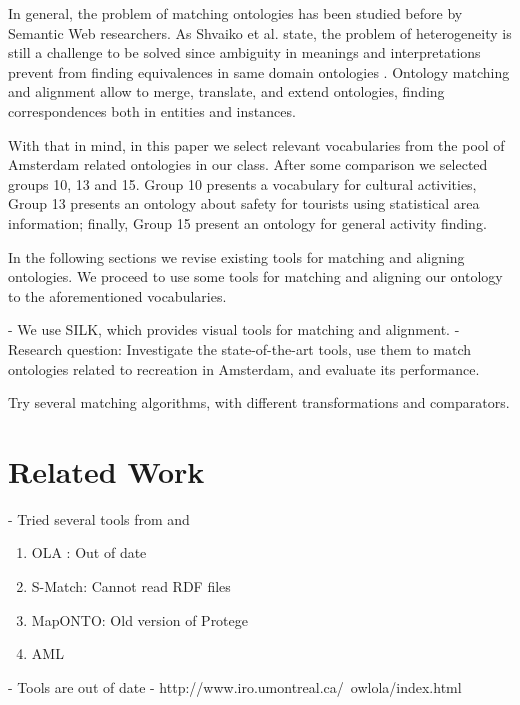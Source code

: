 \documentclass[runningheads,a4paper]{../../StyleFiles/llncs}
\begin{document}
In general, the problem of matching ontologies has been studied before by Semantic Web researchers. As Shvaiko et al. state, the problem of heterogeneity is still a challenge to be solved since ambiguity in meanings and interpretations prevent from finding equivalences in same domain ontologies \cite{shvaiko2013ontology}. Ontology matching and alignment allow to merge, translate, and extend ontologies, finding correspondences both in entities and instances.

With that in mind, in this paper we select relevant vocabularies from the pool of Amsterdam related ontologies in our class. After some comparison we selected groups 10, 13 and 15. Group 10 presents a vocabulary for cultural activities, Group 13 presents an ontology about safety for tourists using statistical area information; finally, Group 15 present an ontology for general activity finding.

In the following sections we revise existing tools for matching and aligning ontologies. We proceed to use some tools for matching and aligning our ontology to the aforementioned vocabularies. 


- We use SILK, which provides visual tools for matching and alignment. 
- Research question: Investigate the state-of-the-art tools, use them to match ontologies related to recreation in Amsterdam, and evaluate its performance.

Try several matching algorithms, with different transformations and comparators. 

\section{Related Work}
- Tried several tools from \cite{ai3:::adaptiveinformation_2014} and \cite{euzenat2007ontology}

\begin{enumerate}
	\item OLA : Out of date \cite{euzenat2004ontology}
	\item S-Match: Cannot read RDF files
	\item MapONTO: Old version of Protege
	\item AML
\end{enumerate}

- Tools are out of date
- http://www.iro.umontreal.ca/~owlola/index.html 
\end{document}
